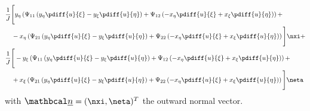%
\begin{align}
    &
    \frac{1}{J} \Bigg[ y_\eta \left(
    \Psi_{11} \left( y_\eta \pdiff{u}{\xi} - y_\xi  \pdiff{u}{\eta}\right)
    + \Psi_{12} \left( - x_\eta \pdiff{u}{\xi} + x_\xi \pdiff{u}{\eta} \right) \right) +
    \\*
    & \quad - x_\eta \left(
    \Psi_{21} \left( y_\eta \pdiff{u}{\xi} - y_\xi  \pdiff{u}{\eta}\right)
    + \Psi_{22} \left( - x_\eta \pdiff{u}{\xi} + x_\xi \pdiff{u}{\eta} \right)
    \right)
    \Bigg] \nxi
    +
    \\
    &\frac{1}{J} \Bigg[
    -y_\xi \left(
    \Psi_{11} \left( y_\eta \pdiff{u}{\xi} - y_\xi  \pdiff{u}{\eta}\right)
    + \Psi_{12} \left( - x_\eta \pdiff{u}{\xi} + x_\xi \pdiff{u}{\eta} \right)  \right) +
    \\*
    &\quad +   x_\xi \left(
    \Psi_{21} \left( y_\eta \pdiff{u}{\xi} - y_\xi  \pdiff{u}{\eta}\right)
    + \Psi_{22} \left( - x_\eta \pdiff{u}{\xi} + x_\xi \pdiff{u}{\eta} \right)  \right)
    \Bigg] \neta
    \label{eq:diffusion_ugiven}
\end{align}
with $\vecn = (\nxi, \neta)^T$ the outward normal vector.



